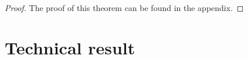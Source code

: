 \documentclass[anon,12pt]{colt2016} %
\begin{document}
\begin{proof}
The proof of this theorem can be found in the appendix.
\end{proof}






 


\appendix
\section{Technical result}
\label{appendix:sectiontr}
\end{document}
